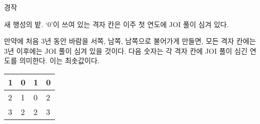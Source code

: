 \begin{problem}{경작}
\begin{center}
	새 행성의 밭. `0'이 쓰여 있는 격자 칸은 이주 첫 연도에 JOI 풀이 심겨 있다.
	\end{center}
	
	만약에 처음 3년 동안 바람을 서쪽, 남쪽, 남쪽으로 불어가게 만들면, 모든 격자 칸에는 3년 이후에는 JOI 풀이 심겨 있을 것이다. 다음 숫자는 각 격자 칸에 JOI 풀이 심긴 연도를 의미한다. 이는 최솟값이다.
	
	\begin{center}
			\begin{tabular}{|l|l|l|l|}
		\hline
		1 & 0 &  1 & 0 \\ \hline
	2	&  1 & 0 &  2 \\ \hline
	3	& 2  & 2  &   3\\ \hline
	\end{tabular}
	\end{center}

	\begin{example}
	\end{example}
	
	
\end{problem}

